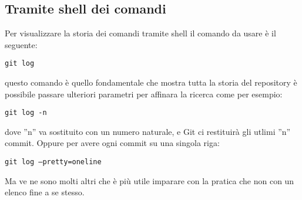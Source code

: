 \subsection{Tramite shell dei comandi}
Per visualizzare la storia dei comandi tramite shell il comando da usare è il seguente:

\begin{center}
\texttt{git log}
\end{center}

questo comando è quello fondamentale che mostra tutta la storia del repository è possibile passare ulteriori parametri per affinara la ricerca come per esempio:

\begin{center}
\texttt{git log -n}
\end{center}

dove ''n'' va sostituito con un numero naturale, e Git ci restituirà gli utlimi ''n'' commit. Oppure per avere ogni commit su una singola riga:

\begin{center}
\texttt{git log --pretty=oneline}
\end{center}

Ma ve ne sono molti altri che è più utile imparare con la pratica che non con un elenco fine a se stesso.